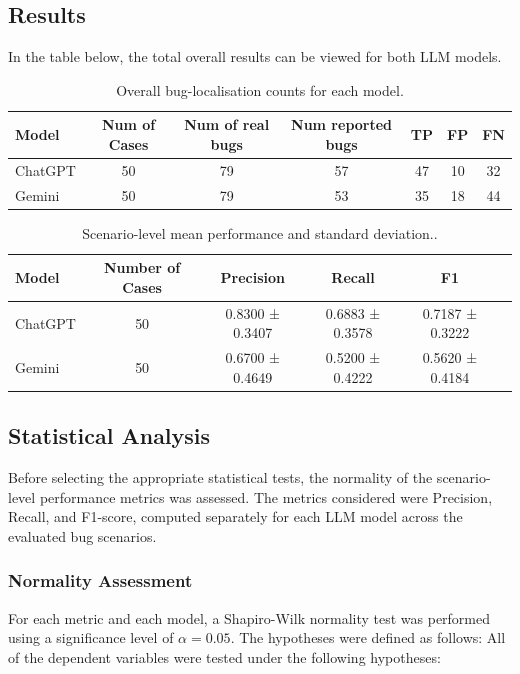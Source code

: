\documentclass[11pt,a4paper]{article}
\begin{document}
    \subsection{Results}
    In the table below, the total overall results can be viewed for both LLM models.
    \begin{table}[h]
        \centering
        \begin{tabular}{lcccccc}
        \hline
        \textbf{Model} & \textbf{Num of Cases} & \textbf{Num of real bugs} & \textbf{Num reported bugs} & \textbf{TP}  & \textbf{FP}  & \textbf{FN}\\
        \hline
        ChatGPT & 50 & 79 & 57 & 47 & 10 & 32 \\
        Gemini & 50 & 79 & 53 & 35 & 18 & 44 \\
        \hline
        \end{tabular}
        \caption{Overall bug-localisation counts for each model.}
        \label{tab:runtime-stats}
    \end{table}

    \begin{table}[h]
        \centering
        \begin{tabular}{lccccc}
        \hline
        \textbf{Model} & \textbf{Number of Cases} & \textbf{Precision} & \textbf{Recall} & \textbf{F1} \\
        \hline
        ChatGPT & 50 & 0.8300 ± 0.3407  & 0.6883 ± 0.3578 & 0.7187 ± 0.3222\\
        Gemini & 50 & 0.6700 ± 0.4649 & 0.5200 ± 0.4222 & 0.5620 ± 0.4184 \\
        \hline
        \end{tabular}
        \caption{ Scenario-level mean performance and standard deviation..}
        \label{tab:runtime-stats}
    \end{table}
    
    \subsection{Statistical Analysis}
    Before selecting the appropriate statistical tests, the normality of the scenario-level performance metrics was assessed. The metrics considered were Precision, Recall, and F1-score, computed separately for each LLM model across the evaluated bug scenarios.
    
    \subsubsection{Normality Assessment}
    For each metric and each model, a Shapiro-Wilk normality test was performed using a significance level of $\alpha = 0.05$. The hypotheses were defined as follows:
     All of the dependent variables were tested under the following hypotheses:
     
\end{document}
